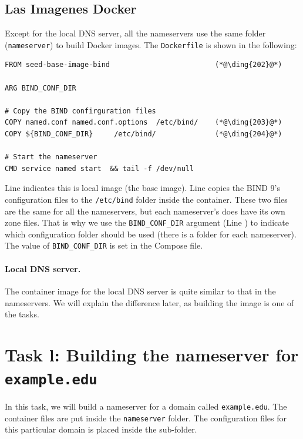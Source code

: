 \subsection{Las Imagenes Docker} 

Except for the local DNS server, all the nameservers use the same 
folder (\texttt{nameserver}) to build Docker images. The 
\texttt{Dockerfile} is shown in the following:  

\begin{lstlisting}
FROM seed-base-image-bind                         (*@\ding{202}@*)

ARG BIND_CONF_DIR

# Copy the BIND confirguration files
COPY named.conf named.conf.options  /etc/bind/    (*@\ding{203}@*)
COPY ${BIND_CONF_DIR}     /etc/bind/              (*@\ding{204}@*)

# Start the nameserver
CMD service named start  && tail -f /dev/null
\end{lstlisting}

Line  indicates this is local image (the base image).
Line  copies the BIND 9's configuration files to
the \texttt{/etc/bind} folder inside the container. These two files
are the same for all the nameservers, but each nameserver's 
does have its own zone files. That is why we use 
the \texttt{BIND\_CONF\_DIR} argument (Line ) to 
indicate which configuration folder should be used (there is 
a folder for each nameserver). The value of \texttt{BIND\_CONF\_DIR} 
is set in the Compose file. 


\paragraph{Local DNS server.}
The container image for the local DNS server is quite similar to
that in the nameservers. We will explain the difference later, 
as building the image is one of the tasks. 




\section{Task l: Building the nameserver for \texttt{example.edu}}

In this task, we will build a nameserver for a domain 
called \texttt{example.edu}. The container files are 
put inside the \texttt{nameserver} folder. 
The configuration files for this particular domain
is placed inside the  sub-folder.  


